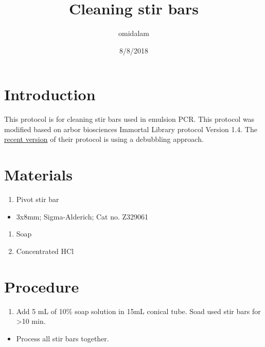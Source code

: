 \documentclass[]{article}
\title{Cleaning stir bars}
\author{omidalam}
\date{8/8/2018}
\providecommand{\tightlist}{%
  \setlength{\itemsep}{0pt}\setlength{\parskip}{0pt}}
\begin{document}
\maketitle

\section{Introduction}\label{introduction}

This protocol is for cleaning stir bars used in emulsion PCR. This
protocol was modified based on arbor biosciences Immortal Library
protocol Version 1.4. The
\href{http://www.arborbiosci.com/wp-content/uploads/2018/05/myTags-Immortal-Protocol-v1.5.pdf}{recent
version} of their protocol is using a debubbling approach.

\section{Materials}\label{materials}

\begin{enumerate}
\def\labelenumi{\arabic{enumi}.}
\tightlist
\item
  Pivot stir bar
\end{enumerate}

\begin{itemize}
\tightlist
\item
  3x8mm; Sigma-Alderich; Cat no. Z329061
\end{itemize}

\begin{enumerate}
\def\labelenumi{\arabic{enumi}.}
\setcounter{enumi}{1}
\tightlist
\item
  Soap
\item
  Concentrated HCl
\end{enumerate}

\section{Procedure}\label{procedure}

\begin{enumerate}
\def\labelenumi{\arabic{enumi}.}
\tightlist
\item
  Add 5 mL of 10\% soap solution in 15mL conical tube. Soad used stir
  bars for \textgreater{}10 min.
\end{enumerate}

\begin{itemize}
\tightlist
\item
  Process all stir bars together.
\end{itemize}
\end{document}
